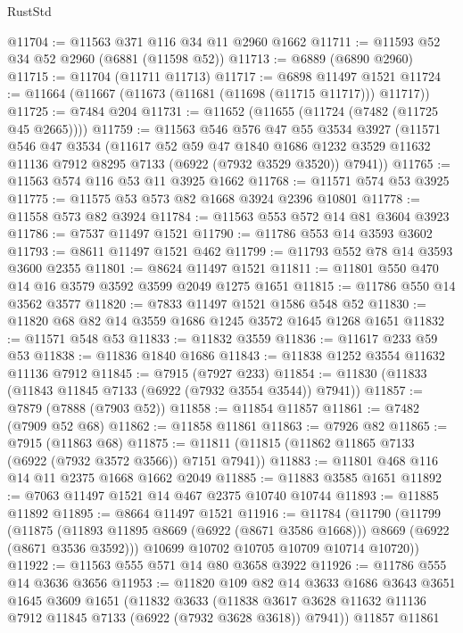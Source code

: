 \begin{lexlean}{RustStd}
\begin{coremodule}
@11704 := @11563 @371 @116 @34 @11 @2960 @1662
@11711 := @11593 @52 @34 @52 @2960 (@6881 (@11598 @52))
@11713 := @6889 (@6890 @2960)
@11715 := @11704 (@11711 @11713)
@11717 := @6898 @11497 @1521
@11724 := @11664 (@11667 (@11673 (@11681 (@11698 (@11715 @11717))) @11717))
@11725 := @7484 @204
@11731 := @11652 (@11655 (@11724 (@7482 (@11725 @45 @2665))))
@11759 := @11563
    @546
    @576
    @47
    @55
    @3534
    @3927
    (@11571
      @546
      @47
      @3534
      (@11617
        @52
        @59
        @47
        @1840
        @1686
        @1232
        @3529
        @11632
        @11136
        @7912
        @8295
        @7133
        (@6922 (@7932 @3529 @3520))
        @7941))
@11765 := @11563 @574 @116 @53 @11 @3925 @1662
@11768 := @11571 @574 @53 @3925
@11775 := @11575 @53 @573 @82 @1668 @3924 @2396 @10801
@11778 := @11558 @573 @82 @3924
@11784 := @11563 @553 @572 @14 @81 @3604 @3923
@11786 := @7537 @11497 @1521
@11790 := @11786 @553 @14 @3593 @3602
@11793 := @8611 @11497 @1521 @462
@11799 := @11793 @552 @78 @14 @3593 @3600 @2355
@11801 := @8624 @11497 @1521
@11811 := @11801 @550 @470 @14 @16 @3579 @3592 @3599 @2049 @1275 @1651
@11815 := @11786 @550 @14 @3562 @3577
@11820 := @7833 @11497 @1521 @1586 @548 @52
@11830 := @11820 @68 @82 @14 @3559 @1686 @1245 @3572 @1645 @1268 @1651
@11832 := @11571 @548 @53
@11833 := @11832 @3559
@11836 := @11617 @233 @59 @53
@11838 := @11836 @1840 @1686
@11843 := @11838 @1252 @3554 @11632 @11136 @7912
@11845 := @7915 (@7927 @233)
@11854 := @11830 (@11833 (@11843 @11845 @7133 (@6922 (@7932 @3554 @3544)) @7941))
@11857 := @7879 (@7888 (@7903 @52))
@11858 := @11854 @11857
@11861 := @7482 (@7909 @52 @68)
@11862 := @11858 @11861
@11863 := @7926 @82
@11865 := @7915 (@11863 @68)
@11875 := @11811 (@11815 (@11862 @11865 @7133 (@6922 (@7932 @3572 @3566)) @7151 @7941))
@11883 := @11801 @468 @116 @14 @11 @2375 @1668 @1662 @2049
@11885 := @11883 @3585 @1651
@11892 := @7063 @11497 @1521 @14 @467 @2375 @10740 @10744
@11893 := @11885 @11892
@11895 := @8664 @11497 @1521
@11916 := @11784
    (@11790
      (@11799
        (@11875 (@11893 @11895 @8669 (@6922 (@8671 @3586 @1668))) @8669 (@6922 (@8671 @3536 @3592)))
        @10699
        @10702
        @10705
        @10709
        @10714
        @10720))
@11922 := @11563 @555 @571 @14 @80 @3658 @3922
@11926 := @11786 @555 @14 @3636 @3656
@11953 := @11820
    @109
    @82
    @14
    @3633
    @1686
    @3643
    @3651
    @1645
    @3609
    @1651
    (@11832
      @3633
      (@11838 @3617 @3628 @11632 @11136 @7912 @11845 @7133 (@6922 (@7932 @3628 @3618)) @7941))
    @11857
    @11861

\end{coremodule}
\end{lexlean}
